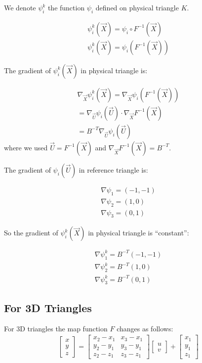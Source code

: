 \documentclass{birkjour}
\numberwithin{equation}{section}
\begin{document}
We denote $\psi^k_i$ the function $\psi_i$ defined on physical triangle $K$.

\begin{eqnarray} 
	\psi^k_i(\vec X) = \psi_i \circ  F^{-1}(\vec X) \nonumber\\
	\psi^k_i(\vec X) = \psi_i( F^{-1}(\vec X) ) \nonumber
\end{eqnarray}

The gradient of $\psi^k_i(\vec X)$ in physical triangle is:

\begin{eqnarray} 
	\nabla_{\vec X} \psi^k_i(\vec X) = \nabla_{\vec X} \psi_i( F^{-1}(\vec X) ) \nonumber\\
    = \nabla_{\vec U} \psi_i( \vec U ) \cdot \nabla_{\vec X} F^{-1}(\vec X) \nonumber\\
    = B^{-T} \nabla_{\vec U} \psi_i( \vec U) \nonumber
\end{eqnarray}
where we used $\vec U = F^{-1}(\vec X)$ and $\nabla_{\vec X} F^{-1}(\vec X) = B^{-T}$.

The gradient of $\psi_i(\vec U)$ in reference triangle is:

\begin{eqnarray} 
	\nabla \psi_1 = (-1, -1) \nonumber\\
	\nabla \psi_2 = (1, 0) \nonumber\\
	\nabla \psi_3 = (0, 1) \nonumber
\end{eqnarray}

So the gradient of $\psi^k_i(\vec X)$ in physical triangle is ``constant'':
 
\begin{eqnarray} 
	\nabla \psi^k_1 = B^{-T} (-1, -1) \nonumber\\
	\nabla \psi^k_2 = B^{-T} (1, 0) \nonumber\\
	\nabla \psi^k_3 = B^{-T} (0, 1) \nonumber
\end{eqnarray}

\subsection{For 3D Triangles}

For 3D triangles the map function $F$ changes as follows:
\begin{eqnarray}
	\left[\begin{array}{c}
		x \\
		y \\
		z
	\end{array}\right] = 
	\left[\begin{array}{cc}
		x_2 - x_1 &  x_3 - x_1 \\
		y_2 - y_1 &  y_3 - y_1 \\
		z_2 - z_1 &  z_3 - z_1
	\end{array}\right] 
	\left[\begin{array}{c}
		u \\
		v
	\end{array}\right] +
	\left[\begin{array}{c}
		x_1 \\
		y_1 \\
		z_1
	\end{array}\right] \nonumber
\end{eqnarray}
\end{document}
